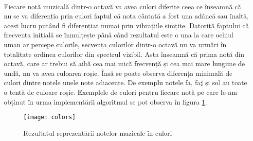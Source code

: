 \documentclass[../IoMusT.tex]{subfiles}
\begin{document}
\\
\par Fiecare notă muzicală dintr-o octavă va avea culori diferite ceea ce în\-seam\-nă că nu se va diferenția prin culori faptul că nota cântată a fost una adâncă sau înaltă, acest lucru putând fi diferențiat numai prin vibrațiile simțite. Datorită faptului că frecvența inițială se înmulțește până când rezultatul este o una la care ochiul uman ar percepe culorile, secvența culorilor dintr-o octavă nu va urmări în totalitate ordinea culorilor din spectrul vizibil. Asta înseamnă că prima notă din octavă, care ar trebui să aibă cea mai mică frecvență și cea mai mare lungime de undă, nu va avea culoarea roșie. Însă se poate observa diferența minimală de culori dintre notele unele note adiacente. De exemplu notele fa, fa$\sharp$ și sol au toate o tentă de culoare roșie. Exemplele de culori pentru fiecare notă pe care le-am obținut în urma implementării algoritmul se pot observa în figura \ref{fig:colors}.
\begin{figure}[h]
\centering
\texttt{[image: colors]}
\caption{Rezultatul reprezentării notelor muzicale în culori}
\label{fig:colors}
\end{figure} 
\end{document}
